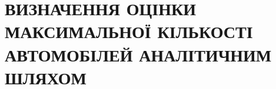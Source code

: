 \chapter{ВИЗНАЧЕННЯ ОЦІНКИ МАКСИМАЛЬНОЇ КІЛЬКОСТІ АВТОМОБІЛЕЙ АНАЛІТИЧНИМ ШЛЯХОМ} 
\label{chapter:theory}
